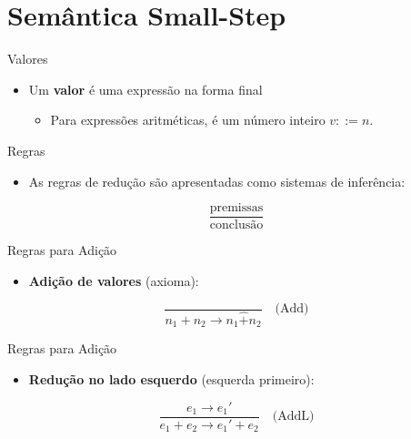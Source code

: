 \section{Semântica Small-Step}\label{semuxe2ntica-small-step}

\begin{frame}{Valores}

    \begin{itemize}

        \item
        Um \textbf{valor} é uma expressão na forma final

        \begin{itemize}

            \item
            Para expressões aritméticas, é um número inteiro \(v ::= n\).
        \end{itemize}
    \end{itemize}
\end{frame}

\begin{frame}{Regras}

    \begin{itemize}

        \item
        As regras de redução são apresentadas como sistemas de inferência:
    \end{itemize}

    \[\frac{\text{premissas}}{\text{conclusão}}\]
\end{frame}

\begin{frame}{Regras para Adição}

    \begin{itemize}

        \item
        \textbf{Adição de valores} (axioma):
    \end{itemize}

    \[\frac{}{n_1 + n_2 \to n_1 \mathbin{\hat{+}} n_2} \quad \text{(Add)}\]
\end{frame}

\begin{frame}{Regras para Adição}

    \begin{itemize}

        \item
        \textbf{Redução no lado esquerdo} (esquerda primeiro):
    \end{itemize}

    \[\frac{e_1 \to e_1'}{e_1 + e_2 \to e_1' + e_2} \quad \text{(AddL)}\]
\end{frame}

